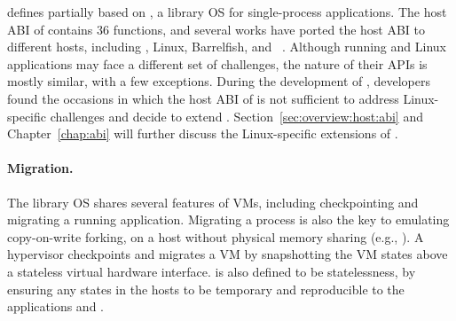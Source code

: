 \graphene{} defines \thehostabi{} partially based on
\drawbridge{},
a library OS for single-process \win{} applications.
The host ABI of \drawbridge{} 
contains 36 functions,
and several works have ported the host ABI to different hosts,
including \win{}, Linux, Barrelfish, and \sgx{}~\cite{porter11drawbridge,baumann14haven,mssql-on-linux,baumann13bascule}.
Although running \win{} and Linux applications may face
a different set of challenges,
the nature of their APIs is mostly similar, with a few exceptions.
During the development of \graphene{}, developers found the occasions in which
the host ABI of \drawbridge{}
is not sufficient to address Linux-specific challenges
and decide to extend \thehostabi{}.
Section~\ref{sec:overview:host:abi} and Chapter~\ref{chap:abi}
will further discuss the Linux-specific extensions of \thehostabi{}.


\paragraph{Migration.}
The \graphene{} library OS shares several features of VMs, including checkpointing and migrating a running application.
Migrating a process is also the key to emulating copy-on-write forking,
on a host without physical memory sharing (e.g., \sgx{}).
A hypervisor checkpoints and migrates a VM by snapshotting the VM states above a stateless virtual hardware interface. %
\Thehostabi{} is also defined to be statelessness,
by ensuring any states in the hosts to be temporary and reproducible to the applications and \libos{}.





\label{sec:overview:host:abi}


